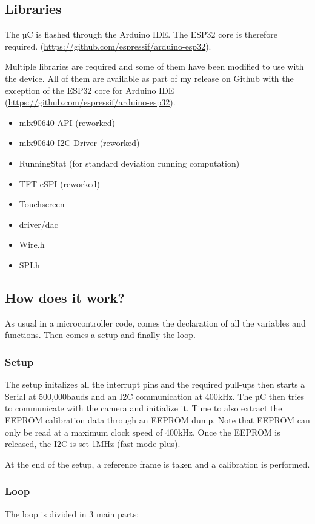 \documentclass[a4paper]{article}
\begin{document}
\subsection{Libraries}
The µC is flashed through the Arduino IDE. The ESP32 core is therefore required. (\url{https://github.com/espressif/arduino-esp32}).

Multiple libraries are required and some of them have been modified to use with the device. All of them are available as part of my release on Github with the exception of the ESP32 core for Arduino IDE (\url{https://github.com/espressif/arduino-esp32}).

\begin{itemize}
    \item mlx90640 API (reworked)
    \item mlx90640 I2C Driver (reworked)
    \item RunningStat (for standard deviation running computation)
    \item TFT eSPI (reworked)
    \item Touchscreen
    \item driver/dac
    \item Wire.h
    \item SPI.h
\end{itemize}


\subsection{How does it work?}
As usual in a microcontroller code, comes the declaration of all the variables and functions. Then comes a setup and finally the loop.

\subsubsection{Setup}
The setup initalizes all the interrupt pins and the required pull-ups then starts a Serial at 500,000bauds and an I2C communication at 400kHz.
The µC then tries to communicate with the camera and initialize it. Time to also extract the EEPROM calibration data through an EEPROM dump. Note that EEPROM can only be read at a maximum clock speed of 400kHz.
Once the EEPROM is released, the I2C is set 1MHz (fast-mode plus).

At the end of the setup, a reference frame is taken and a calibration is performed.

\subsubsection{Loop}
The loop is divided in 3 main parts:
\end{document}
